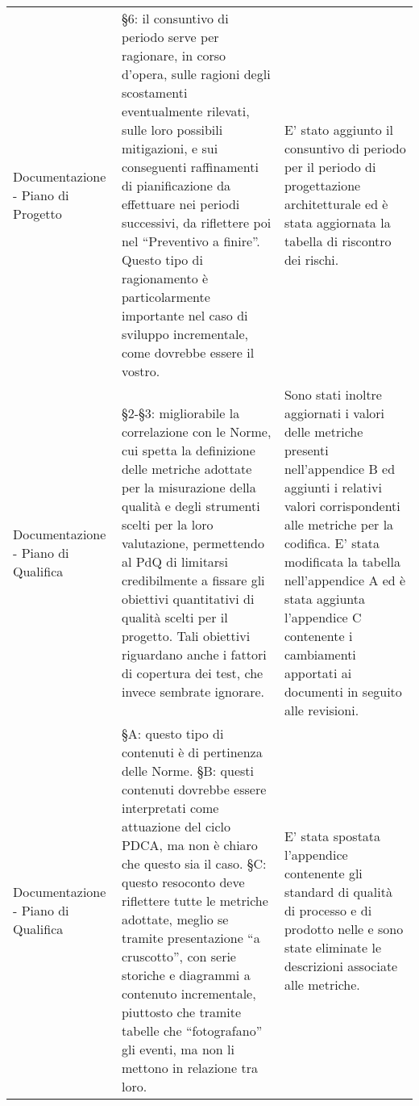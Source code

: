 \begin{longtable}{ 
				>{\centering}p{} 
				>{\centering}p{}
				>{\centering\arraybackslash}p{}}
				Documentazione - Piano di Progetto
					&
				 §6: il consuntivo di periodo serve per ragionare, in corso d'opera, sulle ragioni degli scostamenti eventualmente rilevati, sulle loro possibili mitigazioni, e sui conseguenti raffinamenti di pianificazione da  effettuare nei periodi successivi, da riflettere poi nel “Preventivo a finire”. Questo tipo di ragionamento è particolarmente importante nel caso di sviluppo incrementale, come dovrebbe essere il vostro.
					&
				E' stato aggiunto il consuntivo di periodo per il periodo di progettazione architetturale ed è stata aggiornata la tabella di riscontro dei rischi.
					\\
		 
				 Documentazione - Piano di Qualifica
					&
				§2-§3: migliorabile la correlazione con le Norme, cui spetta la definizione delle metriche adottate per la misurazione della qualità e degli strumenti scelti per la loro valutazione, permettendo al PdQ di limitarsi credibilmente a fissare gli obiettivi quantitativi di qualità scelti per il progetto. Tali obiettivi riguardano anche i fattori di copertura dei test, che invece sembrate ignorare.
					&
				Sono stati inoltre aggiornati i valori delle metriche presenti nell'appendice B ed aggiunti i relativi valori corrispondenti alle metriche per la codifica. E' stata modificata la tabella nell'appendice A ed è stata aggiunta l'appendice C contenente i cambiamenti apportati ai documenti in seguito alle revisioni.
					\\
			
				Documentazione - Piano di Qualifica
					&
				§A: questo tipo di contenuti è di pertinenza delle Norme. §B: questi contenuti dovrebbe essere interpretati come attuazione del ciclo PDCA, ma non è chiaro che questo sia il caso. §C: questo resoconto deve riflettere tutte le metriche adottate, meglio se tramite presentazione “a cruscotto”, con serie storiche e diagrammi a contenuto incrementale, piuttosto che tramite tabelle che “fotografano” gli eventi, ma non li mettono in relazione tra loro.
					&
				E' stata spostata l'appendice contenente gli standard di qualità di processo e di prodotto nelle \NdP{} e sono state eliminate le descrizioni associate alle metriche.
					\\

			\end{longtable}
		
